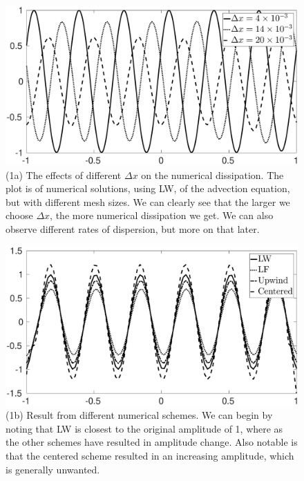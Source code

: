 \documentclass[11pt,letter, swedish, english
]{article}
\newcommand{\Dx}{\ensuremath{\Delta{x}}}
\begin{document}
\begin{figure}
\centering
\includegraphics[width=1\textwidth]{1a.eps}
\caption{(1a) The effects of different $\Dx$ on the numerical
  dissipation. The plot is of numerical solutions, using LW, of the
  advection equation, but with different mesh sizes. We can clearly
  see that the larger we choose $\Dx$, the more numerical dissipation
  we get. We can also observe different rates of dispersion, but more
  on that later. }
\label{fig:1a}
\end{figure}

\begin{figure}
\centering
\includegraphics[width=1\textwidth]{1b.eps}
\caption{(1b) Result from different numerical schemes. We can begin by
noting that LW is closest to the original amplitude of 1, where as the
other schemes have resulted in amplitude change. Also notable is that
the centered scheme resulted in an increasing amplitude, which is
generally unwanted. }
\label{fig:1b}
\end{figure}
\end{document}
